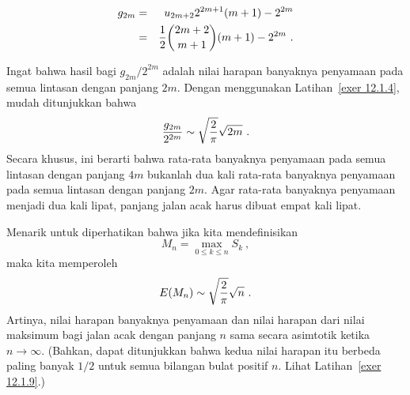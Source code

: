 \begin{example}
\begin{eqnarray*}
g_{2m} &=& u_{2m+2}2^{2m+1}(m+1) - 2^{2m}\\
       &=& {1\over 2}{{2m+2} \choose {m+1}} (m+1)  - 2^{2m}\ .
\end{eqnarray*}

Ingat bahwa hasil bagi $g_{2m}/2^{2m}$ adalah nilai harapan banyaknya penyamaan pada semua
lintasan dengan panjang $2m$.  Dengan menggunakan Latihan~\ref{exer 12.1.4}, mudah ditunjukkan bahwa
$${{g_{2m}}\over{2^{2m}}} \sim \sqrt{2\over \pi}\sqrt {2m}\ .$$
Secara khusus, ini berarti bahwa rata-rata banyaknya penyamaan pada semua lintasan dengan panjang
$4m$ bukanlah dua kali rata-rata banyaknya penyamaan pada semua lintasan dengan panjang $2m$.  Agar
rata-rata banyaknya penyamaan menjadi dua kali lipat, panjang jalan acak harus dibuat empat kali lipat.
\end{example}
Menarik untuk diperhatikan bahwa jika kita mendefinisikan
$$M_n = \max_{0 \le k \le n} S_k\ ,$$
maka kita memperoleh
$$E(M_n) \sim \sqrt{2\over \pi}\sqrt n\ .$$
Artinya, nilai harapan banyaknya penyamaan dan nilai harapan dari nilai maksimum bagi jalan
acak dengan panjang $n$ sama secara asimtotik ketika $n \rightarrow \infty$.  (Bahkan, dapat
ditunjukkan bahwa kedua nilai harapan itu berbeda paling banyak $1/2$ untuk semua bilangan bulat positif $n$.  Lihat
Latihan~\ref{exer 12.1.9}.)

